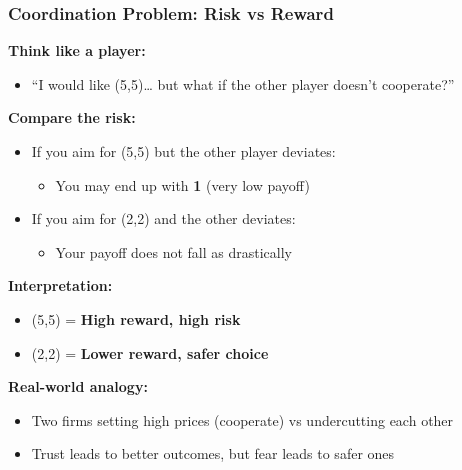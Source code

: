 \begin{frame}[fragile]\frametitle{Coordination Problem: Risk vs Reward}

\textbf{Think like a player:}

\begin{itemize}
  \item “I would like (5,5)… but what if the other player doesn’t cooperate?”
\end{itemize}

\vspace{6pt}

\textbf{Compare the risk:}

\begin{itemize}
  \item If you aim for (5,5) but the other player deviates:
  \begin{itemize}
    \item You may end up with \textbf{1} (very low payoff)
  \end{itemize}
  
  \item If you aim for (2,2) and the other deviates:
  \begin{itemize}
    \item Your payoff does not fall as drastically
  \end{itemize}
\end{itemize}

\vspace{8pt}

\textbf{Interpretation:}
\begin{itemize}
  \item (5,5) = \textbf{High reward, high risk}
  \item (2,2) = \textbf{Lower reward, safer choice}
\end{itemize}

\vspace{8pt}

\textbf{Real-world analogy:}
\begin{itemize}
  \item Two firms setting high prices (cooperate) vs undercutting each other
  \item Trust leads to better outcomes, but fear leads to safer ones
\end{itemize}

\end{frame}

